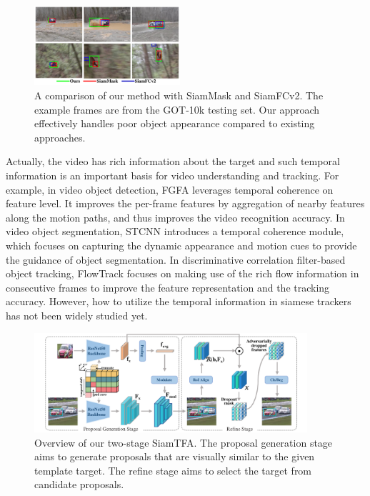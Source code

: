 \documentclass{article}
\begin{document}
\begin{figure}[t]
    \centering
    \includegraphics[width=0.48\textwidth]{images/visulization.pdf}
    \vspace{-0.8cm}
    \caption{A comparison of our method with SiamMask and SiamFCv2. The example frames are from the GOT-10k testing set. Our approach effectively handles poor object appearance compared to existing approaches.}
    \vspace{-0.5cm}
    \label{fig:visulization}
\end{figure}

Actually, the video has rich information about the target and such temporal information is an important basis for video understanding and tracking.
For example, in video object detection, FGFA \cite{zhu2017flow} leverages temporal coherence on feature level. It improves the per-frame features by aggregation of nearby features along the motion paths, and thus improves the video recognition accuracy.
In video object segmentation, STCNN \cite{xu2019spatiotemporal} introduces a temporal coherence module, which focuses on capturing the dynamic appearance and motion cues to provide the guidance of object segmentation.
In discriminative correlation filter-based object tracking, FlowTrack \cite{zhu2018end} focuses on making use of the rich flow information in consecutive frames to improve the feature representation and the tracking accuracy. 
However, how to utilize the temporal information in siamese trackers has not been widely studied yet. 

\begin{figure}[t]
    \centering
    \includegraphics[width=0.9\textwidth]{images/net_v3.pdf}
    \vspace{-0.5cm}
    \caption{
    Overview of our two-stage SiamTFA.
    The proposal generation stage aims to generate proposals that are visually similar to the given template target. The refine stage aims to select the target from candidate proposals.}
    \label{fig:SiamTFA}
\end{figure}
\end{document}
